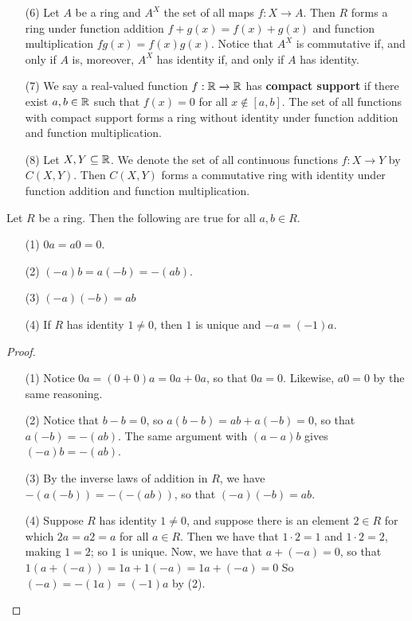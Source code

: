 \begin{example}
\begin{enumerate}
    \item[(6)] Let $A$ be a ring and $A^X$ the set of all maps $f:X \xrightarrow{}
      A$. Then $R$ forms a ring under function addition  $f+g(x)=f(x)+g(x)$ and
      function multiplication $fg(x)=f(x)g(x)$. Notice that $A^X$ is commutative if,
      and only if  $A$ is, moreover, $A^X$ has identity if, and only if  $A$ has
      identity.

    \item[(7)] We say a real-valued function $f:\mathbb{R} \xrightarrow{} \mathbb{R}$ has
      \textbf{compact support} if there exist $a,b \in \mathbb{R}$ such that $f(x)=0$
      for all $x \notin [a,b]$. The set of all functions with compact support
      forms a ring without identity under function addition and function
      multiplication.

    \item[(8)] Let $X,Y \subseteq \mathbb{R}$. We denote the set of all continuous
      functions  $f:X \xrightarrow{} Y$ by $C(X,Y)$. Then $C(X,Y)$ forms a
      commutative ring with identity under function addition and function
      multiplication.
  \end{enumerate}
\end{example}

\begin{lemma}\label{lemma_5.1.1}
  Let $R$ be a ring. Then the following are true for all  $a,b \in R$.
  \begin{enumerate}
    \item[(1)] $0a=a0=0$.

    \item[(2)] $(-a)b=a(-b)=-(ab)$.

    \item[(3)] $(-a)(-b)=ab$

    \item[(4)] If $R$ has identity  $1 \neq 0$, then $1$ is unique and
      $-a=(-1)a$.
  \end{enumerate}
\end{lemma}
\begin{proof}
  \begin{enumerate}
    \item[(1)] Notice $0a=(0+0)a=0a+0a$, so that $0a=0$. Likewise, $a0=0$ by
      the same reasoning.

    \item[(2)] Notice that $b-b=0$, so $a(b-b)=ab+a(-b)=0$, so that
      $a(-b)=-(ab)$. The same argument with $(a-a)b$ gives $(-a)b=-(ab)$.

    \item[(3)] By the inverse laws of addition in $R$, we have
      $-(a(-b))=-(-(ab))$, so that $(-a)(-b)=ab$.

    \item[(4)] Suppose $R$ has identity $1 \neq 0$, and suppose there is an
      element $2 \in R$ for which  $2a=a2=a$ for all $a \in R$. Then we have
      that $1 \cdot 2=1$ and  $1 \cdot 2=2$, making  $1=2$; so  $1$ is unique.
      Now, we have that $a+(-a)=0$, so that $1(a+(-a))=1a+1(-a)=1a+(-a)=0$ So
      $(-a)=-(1a)=(-1)a$ by (2).
  \end{enumerate}
\end{proof}

